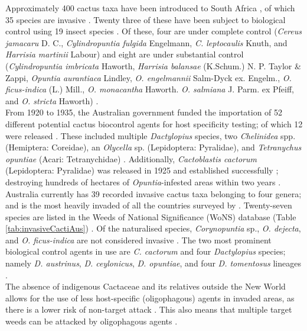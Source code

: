 \noindent Approximately 400 cactus taxa have been introduced to South Africa \citep{kaplan2017proposed}, of which 35 species are invasive \citep{Novoa2015IntroducedReview}. Twenty three of these have been subject to biological control using 19 insect species \citep{Zimmermann2009, Klein2011,Paterson2011BiologicalAfrica}. Of these, four are under complete control (\textit{Cereus jamacaru} D. C., \textit{Cylindropuntia fulgida} Engelmann, \textit{C. leptocaulis} Knuth, and \textit{Harrisia martinii} Labour) and eight are under substantial control (\textit{Cylindropuntia imbricata} Haworth, \textit{Harrisia balansae} (K.Schum.)  N. P. Taylor \& Zappi, \textit{Opuntia aurantiaca} Lindley, \textit{O. engelmannii} Salm-Dyck ex. Engelm., \textit{O. ficus-indica} (L.) Mill., \textit{O. monacantha} Haworth. \textit{O. salmiana} J. Parm. ex Pfeiff, and \textit{O. stricta}  Haworth) \citep{Klein2011}. \\
From 1920 to 1935, the Australian government funded the importation of 52 different potential cactus biocontrol agents for host specificity testing; of which 12 were released \citep{raghu2007understanding}. These included multiple \textit{Dactylopius} species, two \textit{Chelinidea} spp. (Hemiptera: Coreidae), an \textit{Olycella} sp. (Lepidoptera: Pyralidae), and \textit{Tetranychus opuntiae} (Acari: Tetranychidae) \citep{raghu2007understanding}. Additionally, \textit{Cactoblastis cactorum} (Lepidoptera: Pyralidae) was released in 1925 and established successfully \citep{mann1970cacti}; destroying hundreds of hectares of \textit{Opuntia}-infested areas within two years \citep{raghu2007understanding}.
Australia currently has 39 recorded invasive cactus taxa belonging to four genera; and is the most heavily invaded of all the countries surveyed by \citet{Novoa2015IntroducedReview}. Twenty-seven species are listed in the Weeds of National Significance (WoNS) database (Table \ref{tab:invasiveCactiAus}) \citep{managingOpuntioid2017}. Of the naturalised species, \textit{Corynopuntia} sp., \textit{O. dejecta}, and \textit{O. ficus-indica} are not considered invasive \citep{managingOpuntioid2017}. The two most prominent biological control agents in use are \textit{C. cactorum} and four \textit{Dactylopius} species; namely \textit{D. austrinus}, \textit{D. ceylonicus}, \textit{D. opuntiae}, and four \textit{D. tomentosus} lineages \citep{managingOpuntioid2017}. \\
The absence of indigenous Cactaceae and its relatives outside the New World allows for the use of less host-specific (oligophagous) agents in invaded areas, as there is a lower risk of non-target attack \citep{Zimmermann2002}. This also means that multiple target weeds can be attacked by oligophagous agents \citep{paterson2019prospects}. \\

